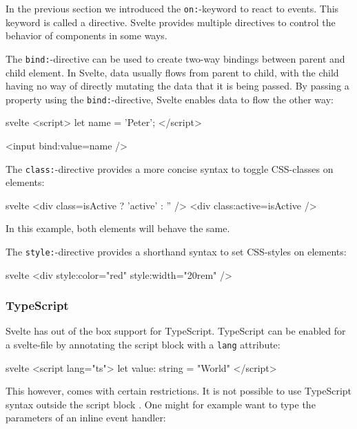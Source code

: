 

In the previous section we introduced the \texttt{on:}-keyword to react to events. This keyword is called a directive. Svelte provides multiple directives to control the behavior of components in some ways.

The \texttt{bind:}-directive can be used to create two-way bindings between parent and child element. In Svelte, data usually flows from parent to child, with the child having no way of directly mutating the data that it is being passed. By passing a property using the \texttt{bind:}-directive, Svelte enables data to flow the other way:

\begin{myminted}{svelte}{}
<script>
  let name = 'Peter';
</script>

<input bind:value={name} />
\end{myminted}

The \texttt{class:}-directive provides a more concise syntax to toggle CSS-classes on elements:
\begin{myminted}{svelte}{}
<div class={isActive ? 'active' : ''} />
<div class:active={isActive} />
\end{myminted}
In this example, both elements will behave the same.

The \texttt{style:}-directive provides a shorthand syntax to set CSS-styles on elements:
\begin{myminted}{svelte}{}
<div style:color="red" style:width="20rem" />
\end{myminted}

\subsubsection{TypeScript}

Svelte has out of the box support for TypeScript. TypeScript can be enabled for a svelte-file by annotating the  script block with a \texttt{lang} attribute:

\begin{myminted}{svelte}{}
<script lang="ts">
  let value: string = "World"
</script>
\end{myminted}

This however, comes with certain restrictions. It is not possible to use TypeScript syntax outside the script block \cite{noauthor_proposal_nodate}. One might for example want to type the parameters of an inline event handler:

